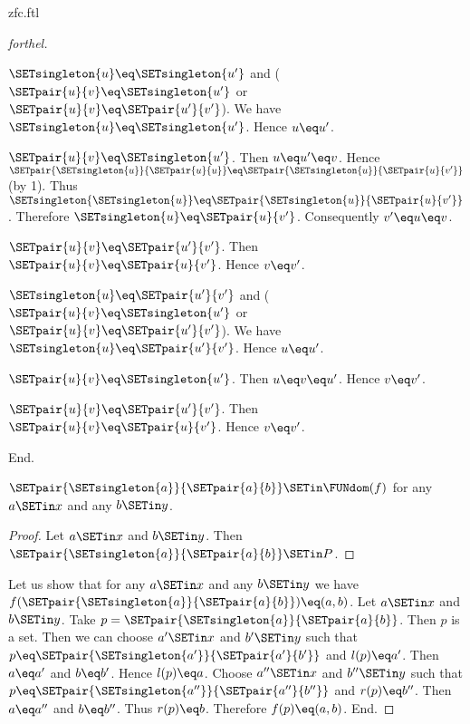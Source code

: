 \documentclass{stex}
\begin{document}
\begin{smodule}{zfc.ftl}
\begin{proof}[forthel]
    \begin{case}{$\SETsingleton{u} \eq \SETsingleton{u'}$ and ($\SETpair{u}{v} \eq \SETsingleton{u'}$ or $\SETpair{u}{v} \eq \SETpair{u'}{v'}$).}
      We have $\SETsingleton{u} \eq \SETsingleton{u'}$.
      Hence $u \eq u'$.

      \begin{case}{$\SETpair{u}{v} \eq \SETsingleton{u'}$.}
        Then $u \eq u'\eq v$.
        Hence $\SETpair{\SETsingleton{u}}{\SETpair{u}{u}} \eq \SETpair{\SETsingleton{u}}{\SETpair{u}{v'}}$ (by 1).
        Thus $\SETsingleton{\SETsingleton{u}} \eq \SETpair{\SETsingleton{u}}{\SETpair{u}{v'}}$.
        Therefore $\SETsingleton{u} \eq \SETpair{u}{v'}$.
        Consequently $v' \eq u \eq v$.
      \end{case}

      \begin{case}{$\SETpair{u}{v} \eq \SETpair{u'}{v'}$.}
        Then $\SETpair{u}{v} \eq \SETpair{u}{v'}$.
        Hence $v \eq v'$.
      \end{case}
    \end{case}

    \begin{case}{$\SETsingleton{u} \eq \SETpair{u'}{v'}$ and ($\SETpair{u}{v} \eq \SETsingleton{u'}$ or $\SETpair{u}{v} \eq \SETpair{u'}{v'}$).}
      We have $\SETsingleton{u} \eq \SETpair{u'}{v'}$.
      Hence $u \eq u'$.

      \begin{case}{$\SETpair{u}{v} \eq \SETsingleton{u'}$.}
        Then $u \eq v \eq u'$.
        Hence $v \eq v'$.
      \end{case}

      \begin{case}{$\SETpair{u}{v} \eq \SETpair{u'}{v'}$.}
        Then $\SETpair{u}{v} \eq \SETpair{u}{v'}$.
        Hence $v \eq v'$.
      \end{case}
    \end{case}
  End.

  $\SETpair{\SETsingleton{a}}{\SETpair{a}{b}} \SETin \FUNdom(f)$ for any $a \SETin x$ and any $b \SETin y$. %
  \begin{proof}
    Let $a \SETin x$ and $b \SETin y$.
    Then $\SETpair{\SETsingleton{a}}{\SETpair{a}{b}} \SETin P$.
  \end{proof}

  Let us show that for any $a \SETin x$ and any $b \SETin y$ we have $f(\SETpair{\SETsingleton{a}}{\SETpair{a}{b}}) \eq (a,b)$.
    Let $a \SETin x$ and $b \SETin y$.
    Take $p = \SETpair{\SETsingleton{a}}{\SETpair{a}{b}}$.
    Then $p$ is a set.
    Then we can choose $a' \SETin x$ and $b' \SETin y$ such that $p \eq \SETpair{\SETsingleton{a'}}{\SETpair{a'}{b'}}$ and $l(p) \eq a'$.
    Then $a \eq a'$ and $b \eq b'$.
    Hence $l(p) \eq a$.
    Choose $a'' \SETin x$ and $b'' \SETin y$ such that $p \eq \SETpair{\SETsingleton{a''}}{\SETpair{a''}{b''}}$ and $r(p) \eq b''$.
    Then $a \eq a''$ and $b \eq b''$.
    Thus $r(p) \eq b$.
    Therefore $f(p) \eq (a,b)$.
  End.


\end{proof}
\end{smodule}
\end{document}
